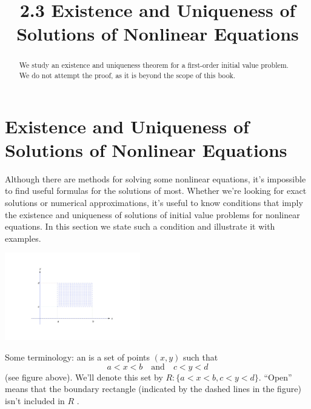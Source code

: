 \documentclass{ximera}
\title{2.3 Existence and Uniqueness of Solutions of Nonlinear Equations}%
\begin{document}
\begin{abstract}
We study  an existence and uniqueness theorem for a first-order initial value problem.  We do not attempt the proof, as it is beyond the scope of this book.
\end{abstract}

\maketitle

\section*{Existence and Uniqueness of Solutions of Nonlinear Equations}

Although  there are  methods for
 solving some nonlinear equations, it's
impossible to find  useful formulas for the solutions of most.
Whether we're looking for  exact solutions or numerical
approximations, it's useful to know  conditions that imply the
existence and uniqueness of solutions of initial value problems for
nonlinear equations. In this section we state  such a condition and
illustrate it with examples.

\begin{image}
 \includegraphics[height=1.5in]{fig020301.jpg}
\end{image}




Some terminology:
 an 
 is a set of points $(x,y)$ such that
$$
a<x<b\quad\mbox{and}\quad c<y<d
$$
 (see figure above).  We'll denote this set by
$R:  \{ a < x < b, c < y < d \}$.
 ``Open'' means that the
boundary rectangle (indicated by the dashed lines in
the figure) isn't  included in  $R$ .
\end{document}

